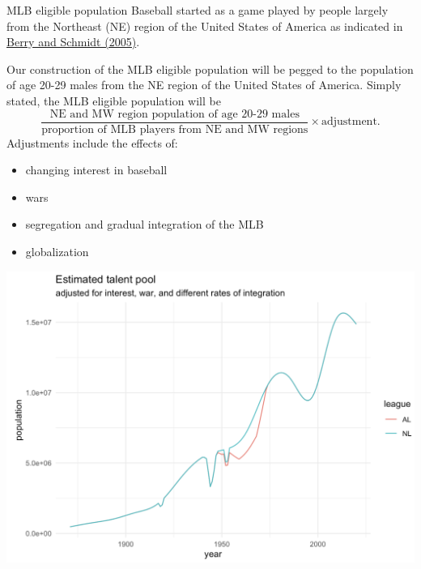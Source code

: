 \documentclass[
  ignorenonframetext,
]{beamer}
\providecommand{\tightlist}{%
  \setlength{\itemsep}{0pt}\setlength{\parskip}{0pt}}
\begin{document}
\begin{frame}{MLB eligible population}
\protect\hypertarget{mlb-eligible-population}{}
Baseball started as a game played by people largely from the Northeast
(NE) region of the United States of America as indicated in
\href{https://journals.sagepub.com/doi/10.1177/1527002504268613}{Berry
and Schmidt (2005)}.

Our construction of the MLB eligible population will be pegged to the
population of age 20-29 males from the NE region of the United States of
America. Simply stated, the MLB eligible population will be \[
  \frac{\text{NE and MW region population of age 20-29 males}}{\text{proportion of MLB players from NE and MW regions}} \times \text{adjustment}.
\] Adjustments include the effects of:

\begin{itemize}
\tightlist
\item
  changing interest in baseball
\item
  wars
\item
  segregation and gradual integration of the MLB
\item
  globalization
\end{itemize}
\end{frame}

\begin{frame}{}
\protect\hypertarget{section-7}{}
\includegraphics{MLBeligiblepop.png}
\end{frame}
\end{document}
